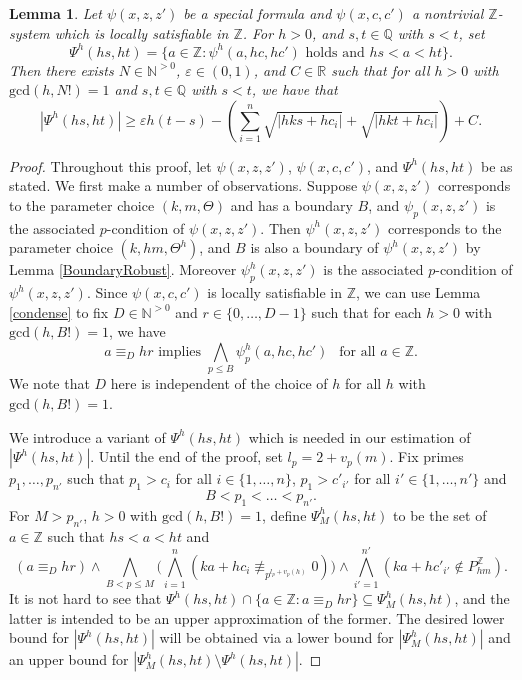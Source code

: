 \documentclass[letterpaper]{amsart}
\newcommand{\qq}{\mathbb{Q}}
\newcommand{\rr}{\mathbb{R}}
\newcommand{\nn}{\mathbb{N}}
\newcommand{\zz}{\mathbb{Z}}
\newtheorem{lem}[thm]{Lemma}
\begin{document}
\begin{lem} \label{positivedensity} Let $\psi(x, z, z')$ be a special formula and $\psi(x,c,c')$ a nontrivial $\zz$-system which is locally satisfiable in $\zz$. For $h > 0$, and $s, t \in \qq$ with $s< t$, set 
$$\Psi^h(hs,ht) = \{ a \in \zz: \psi^h(a,hc,hc') \text{ holds and } hs<a<ht\}.$$ Then there exists $N \in \nn^{>0}$,  $\varepsilon\in (0,1)$, and $C\in \rr$ such that for all $h > 0$ with $\mathrm{gcd}(h,N!)=1$ and $s, t \in \qq$ with $s<t$, we have that
$$|\Psi^h(hs,ht)| \geq \varepsilon h(t-s) - \left(\sum_{i=1}^{n}\sqrt{|hks+hc_i|} + \sqrt{|hkt+hc_i|}\right)  + C. $$ 
\end{lem}
\begin{proof}
Throughout this proof, let  $\psi(x,z,z')$, $\psi(x,c,c')$,  and $\Psi^h(hs,ht)$ be as stated. We first make a number of observations. Suppose $\psi(x,z,z')$ corresponds to the parameter choice $(k,m,\Theta)$ and has a boundary $B$, and $\psi_p(x,z,z')$ is the associated $p$-condition of  $\psi(x,z,z')$.  Then $\psi^h(x,z,z')$ corresponds to the parameter choice $(k,hm,\Theta^h)$, and $B$ is also a boundary of $\psi^h(x,z,z')$ by Lemma \ref{BoundaryRobust}. Moreover $\psi^h_p(x,z,z')$ is the associated $p$-condition of $\psi^h(x,z,z')$. Since $\psi(x,c,c')$ is locally satisfiable in $\zz$, we can use Lemma \ref{condense} to fix $D\in\nn^{>0}$ and $r\in \{0,\ldots, D-1\}$ such that for each $h > 0$ with $\mathrm{gcd}(h,B!)=1$, we have
$$  a\equiv_{D} hr \text{ implies } \bigwedge_{p \leq B} \psi^h_p(a,hc, hc')\ \  \text{ for all } a \in \zz.  $$
We note that $D$ here is independent of the choice of $h$ for all $h$ with $\mathrm{gcd}(h,B!)=1$.

We introduce a variant of  $\Psi^h(hs,ht)$ which is needed in our estimation of $|\Psi^h(hs,ht)|$. Until the end of the proof, set $l_p =2 + v_p(m)$.  Fix primes $p_1, \ldots, p_{n'}$ such that $p_1 > c_i$ for all  $i \in \{1, \ldots, n\}$, $p_1 > c'_{i'}$ for all $i' \in \{1, \ldots, n'\}$ and $$ B<p_1 < \ldots < p_{n'}.$$  For $M>p_{n'}$, $h > 0$ with $\mathrm{gcd}(h,B!)=1$, define $\Psi^h_{M}(hs,ht)$ to be the set of $a \in \zz$ such that $hs<a<ht$ and
$$(a\equiv_{D} hr) \wedge\bigwedge_{B< p \leq M}\big( \bigwedge_{i=1}^{n}(ka+hc_i \not \equiv_{p^{l_{p}+v_p(h)}} 0)\big)\wedge\bigwedge_{i'=1}^{n'}(ka+hc'_{i'} \notin P_{hm}^{\zz}).$$
It is not hard to see that $\Psi^h(hs,ht)\cap \{a\in \zz: a\equiv_D hr\}\subseteq \Psi^h_{M}(hs,ht)$, and the latter is intended to be an upper approximation of the former. The desired lower bound for $|\Psi^h(hs,ht)|$ will be obtained via a lower bound for $|\Psi^h_{M}(hs,ht)|$ and an upper bound for $|\Psi^h_{M}(hs,ht)\setminus \Psi^h(hs,ht)| $. 


\end{proof}
\end{document}
